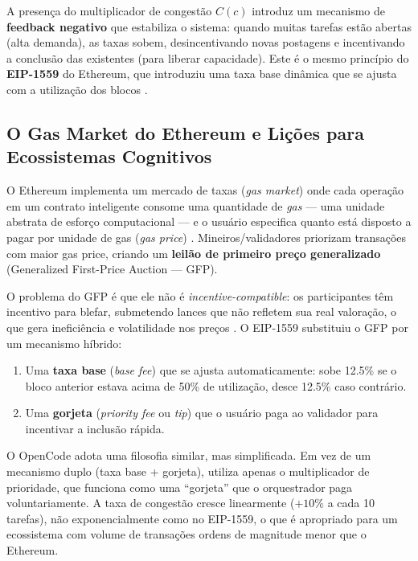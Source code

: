 A presença do multiplicador de congestão $C(c)$ introduz um mecanismo de \textbf{feedback negativo} que estabiliza o sistema: quando muitas tarefas estão abertas (alta demanda), as taxas sobem, desincentivando novas postagens e incentivando a conclusão das existentes (para liberar capacidade). Este é o mesmo princípio do \textbf{EIP-1559} do Ethereum, que introduziu uma taxa base dinâmica que se ajusta com a utilização dos blocos \cite{roughgarden2021transaction, buterin2019eip1559}.

\subsection{O Gas Market do Ethereum e Lições para Ecossistemas Cognitivos}

O Ethereum implementa um mercado de taxas (\textit{gas market}) onde cada operação em um contrato inteligente consome uma quantidade de \textit{gas} --- uma unidade abstrata de esforço computacional --- e o usuário especifica quanto está disposto a pagar por unidade de gas (\textit{gas price}) \cite{wood2014ethereum}. Mineiros/validadores priorizam transações com maior gas price, criando um \textbf{leilão de primeiro preço generalizado} (Generalized First-Price Auction --- GFP).

O problema do GFP é que ele não é \textit{incentive-compatible}: os participantes têm incentivo para blefar, submetendo lances que não refletem sua real valoração, o que gera ineficiência e volatilidade nos preços \cite{edelman2007internet}. O EIP-1559 substituiu o GFP por um mecanismo híbrido:

\begin{enumerate}
    \item Uma \textbf{taxa base} (\textit{base fee}) que se ajusta automaticamente: sobe 12.5\% se o bloco anterior estava acima de 50\% de utilização, desce 12.5\% caso contrário.
    \item Uma \textbf{gorjeta} (\textit{priority fee} ou \textit{tip}) que o usuário paga ao validador para incentivar a inclusão rápida.
\end{enumerate}

O OpenCode adota uma filosofia similar, mas simplificada. Em vez de um mecanismo duplo (taxa base + gorjeta), utiliza apenas o multiplicador de prioridade, que funciona como uma ``gorjeta'' que o orquestrador paga voluntariamente. A taxa de congestão cresce linearmente ($+10\%$ a cada 10 tarefas), não exponencialmente como no EIP-1559, o que é apropriado para um ecossistema com volume de transações ordens de magnitude menor que o Ethereum.

